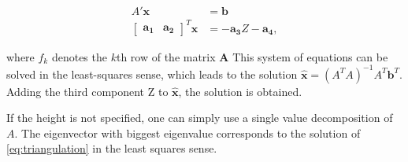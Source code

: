 \begin{align}
    A'\mathbf{x}&=\mathbf{b}\\  
    \begin{bmatrix} \mathbf{a_1} & \mathbf{a_2} \end{bmatrix}^T \mathbf{x} &= -\mathbf{a_3}Z-\mathbf{a_4},
\end{align}

where $f_k$ denotes the $k$th row of the matrix $\mathbf{A}$
This system of equations can be solved in the least-squares sense, which leads to the solution $\mathbf{\hat{x}}=(A^TA)^{-1}A^T\mathbf{b}^T$. 
Adding the third component Z to $\mathbf{\hat{x}}$, the solution is obtained.

If the height is not specified, one can simply use a single value decomposition of $A$. The eigenvector with biggest eigenvalue corresponds to the solution of \eqref{eq:triangulation} in the least squares sense.


%	
%	
